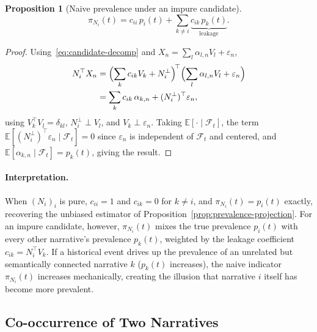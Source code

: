 \documentclass[
  journal=medium,
  manuscript=article-type,
  year=2025,
  volume=1,
]{cup-journal}
\newtheorem{proposition}{Proposition}
\begin{document}
\begin{proposition}[Naive prevalence under an impure candidate]
\label{prop:naive-prevalence}
\begin{equation}
    \pi_{N_i}(t) = c_{ii}\, p_i(t) + \sum_{k\ne i} \underbrace{c_{ik}\, p_k(t)}_{\text{leakage}}.
\end{equation}
\end{proposition}

\begin{proof}
Using~\eqref{eq:candidate-decomp} and $X_n = \sum_l \alpha_{l,n}V_l+\varepsilon_n$,
\begin{align*}
    N_i^\top X_n &= \Bigl(\sum_k c_{ik}V_k + N_i^\perp\Bigr)^{\!\top}\Bigl(\sum_l \alpha_{l,n}V_l+\varepsilon_n\Bigr) \\
    &= \sum_{k} c_{ik}\,\alpha_{k,n} + (N_i^\perp)^\top\varepsilon_n,
\end{align*}
using $V_k^\top V_l=\delta_{kl}$, $N_i^\perp\perp V_l$, and $V_k\perp\varepsilon_n$.
Taking $\mathbb E[\cdot\mid\mathcal F_t]$, the term $\mathbb
E[(N_i^\perp)^\top\varepsilon_n\mid\mathcal F_t]=0$ since $\varepsilon_n$ is
independent of $\mathcal F_t$ and centered, and $\mathbb
E[\alpha_{k,n}\mid\mathcal F_t]=p_k(t)$, giving the result.
\end{proof}

\paragraph{Interpretation.}
When $(N_i)_i$ is pure, $c_{ii}=1$ and $c_{ik}=0$ for $k\ne i$, and
$\pi_{N_i}(t)=p_i(t)$ exactly, recovering the unbiased estimator of
Proposition~\ref{prop:prevalence-projection}. For an impure candidate,
however, $\pi_{N_i}(t)$ mixes the true prevalence $p_i(t)$ with every other
narrative's prevalence $p_k(t)$, weighted by the leakage coefficient
$c_{ik}=N_i^\top V_k$. If a historical event drives up the prevalence of an
unrelated but semantically connected narrative $k$ ($p_k(t)$ increases), the
naive indicator $\pi_{N_i}(t)$ increases mechanically, creating the illusion
that narrative $i$ itself has become more prevalent.

\subsection{Co-occurrence of Two Narratives}
\label{sec:naive-failure:cooccurrence}
\end{document}
